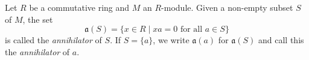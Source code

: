 Let $R$ be a commutative ring and $M$ an $R$-module. Given a non-empty subset $S$ of $M$, the set
$$\mathfrak{a}(S) = \{x \in R \mid xa = 0 \text{ for all } a \in S\}$$
is called the \emph{annihilator} of $S$. If $S = \{a\}$, we write $\mathfrak{a}(a)$ for $\mathfrak{a}(S)$ and call this the \emph{annihilator} of $a$.

